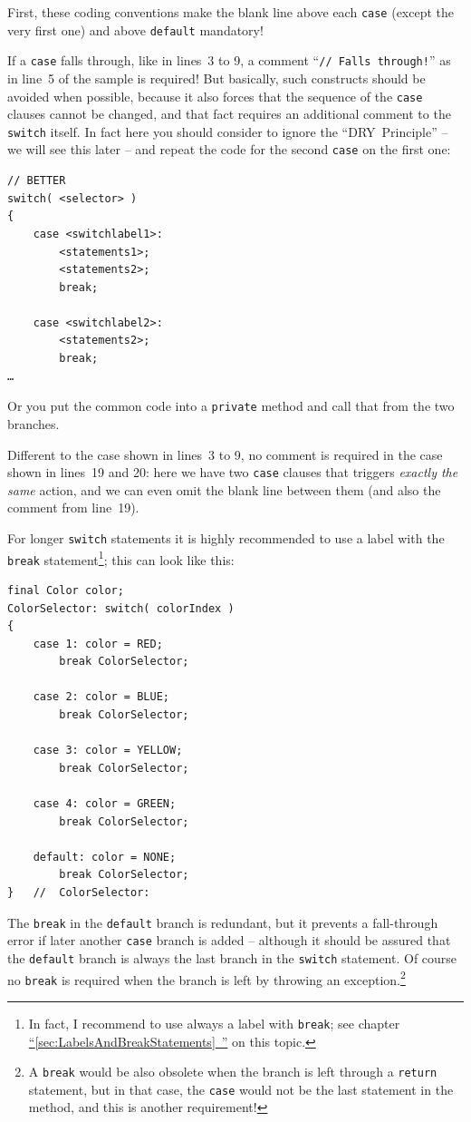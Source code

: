 \documentclass[11pt,a4paper, titlepage, parskip=half, headsepline, footsepline, cleardoublepage=current, headheight=1cm]{scrbook}
\newcommand*{\tqfullref}[1]{\hyperref[{#1}]{“\ref*{#1}~\nameref*{#1}”}}
\begin{document}
First, these coding conventions make the blank line above each \lstinline|case| (except the very first one) and above \lstinline|default| mandatory!
  
If a \lstinline|case| falls through, like in lines~3 to 9, a comment “\lstinline|// Falls through!|” as in line~5 of the sample is required! But basically, such constructs should be avoided when possible, because it also forces that the sequence of the \lstinline|case| clauses cannot be changed, and that fact requires an additional comment to the \lstinline|switch| itself. In fact here you should consider to ignore the “DRY~Principle” – we will see this later – and repeat the code for the second \lstinline|case| on the first one:
\begin{lstlisting}
// BETTER
switch( <selector> )
{
    case <switchlabel1>:
        <statements1>;
        <statements2>;
        break;

    case <switchlabel2>:
        <statements2>;
        break;
…
\end{lstlisting}
Or you put the common code into a \lstinline|private| method and call that from the two branches. 

Different to the case shown in lines~3 to 9, no comment is required in the case shown in lines~19 and 20: here we have two \lstinline|case| clauses that triggers \textit{exactly the same} action, and we can even omit the blank line between them (and also the comment from line~19).

For longer \lstinline|switch| statements it is highly recommended to use a label with the \lstinline|break| statement\footnote{In fact, I recommend to use always a label with \lstinline|break|; see chapter \tqfullref{sec:LabelsAndBreakStatements} on this topic.}; this can look like this:
\begin{lstlisting}
final Color color;
ColorSelector: switch( colorIndex )
{
    case 1: color = RED; 
        break ColorSelector;
        
    case 2: color = BLUE; 
        break ColorSelector;
        
    case 3: color = YELLOW; 
        break ColorSelector;
        
    case 4: color = GREEN; 
        break ColorSelector;
        
    default: color = NONE; 
        break ColorSelector;
}   //  ColorSelector:
\end{lstlisting}

The \lstinline|break| in the \lstinline|default| branch is redundant, but it prevents a fall-through error if later another \lstinline|case| branch is added – although it should be assured that the \lstinline|default| branch is always the last branch in the \lstinline|switch| statement. Of course no \lstinline|break| is required when the branch is left by throwing an exception.\footnote{A \lstinline|break| would be also obsolete when the branch is left through a \lstinline|return| statement, but in that case, the \lstinline|case| would not be the last statement in the method, and this is another requirement!}
\end{document}
